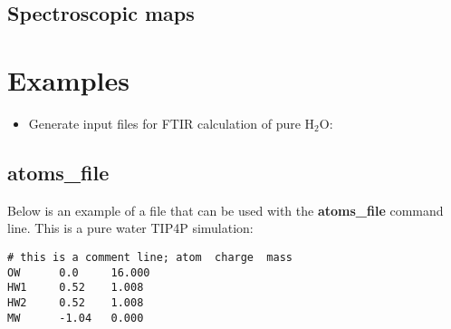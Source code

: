 \documentclass{article}
\begin{document}
\subsection{Spectroscopic maps}

\section{Examples}
\begin{itemize}

\item Generate input files for FTIR calculation of pure H$_2$O:


\end{itemize}

 



\begin{appendix}
\section{\label{app:atomsf}atoms\_file}
Below is an example of a file that can be used with the \textbf{atoms\_file} command line. This is a pure water TIP4P simulation:
\begin{verbatim}
# this is a comment line; atom  charge  mass
OW      0.0     16.000
HW1     0.52    1.008
HW2     0.52    1.008
MW      -1.04   0.000
\end{verbatim}

\end{appendix}
\end{document}

